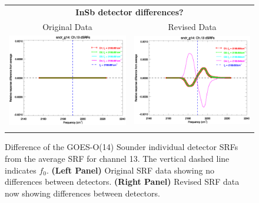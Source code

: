 \begin{figure}[htp]
  \centering
  \begin{tabular}{c c}
    \multicolumn{2}{c}{\textsf{\bfseries InSb detector differences?}} \\
    \hspace{1.5em}\textsf{Original Data} &
    \hspace{1.5em}\textsf{Revised Data} \\
    \includegraphics[scale=0.5,trim=0 40 0 0]{graphics/dsrf_anomaly/original/sndr_g14.ch13.srf.eps} &
    \includegraphics[scale=0.5,trim=0 40 0 0]{graphics/dsrf_anomaly/revised/sndr_g14.ch13.srf.eps} \\\\
  \end{tabular}
  \caption{Difference of the GOES-O(14) Sounder individual detector SRFs from the average SRF for channel 13. The vertical dashed line indicates $f_0$. \textbf{(Left Panel)} Original SRF data showing no differences between detectors. \textbf{(Right Panel)} Revised SRF data now showing differences between detectors.}
  \label{fig:sndr_g14.ch13.dsrf_anomaly}
\end{figure}

